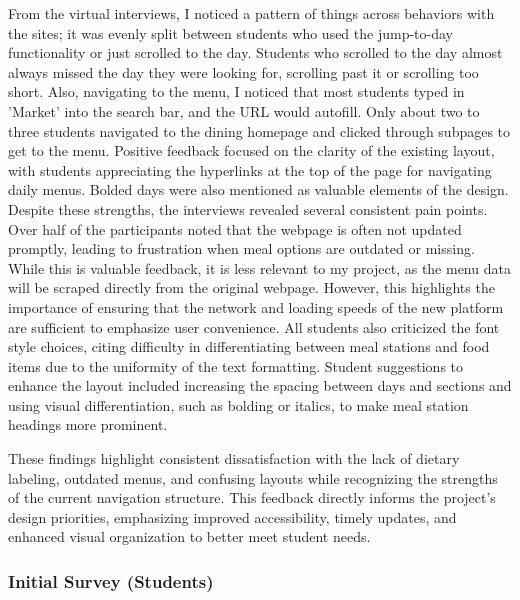 \documentclass[10pt,twocolumn]{article}
\begin{document}
From the virtual interviews, I noticed a pattern of things across behaviors with the sites; it was evenly split between students who used the jump-to-day functionality or just scrolled to the day. Students who scrolled to the day almost always missed the day they were looking for, scrolling past it or scrolling too short. Also, navigating to the menu, I noticed that most students typed in 'Market' into the search bar, and the URL would autofill. Only about two to three students navigated to the dining homepage and clicked through subpages to get to the menu. Positive feedback focused on the clarity of the existing layout, with students appreciating the hyperlinks at the top of the page for navigating daily menus. Bolded days were also mentioned as valuable elements of the design. Despite these strengths, the interviews revealed several consistent pain points. Over half of the participants noted that the webpage is often not updated promptly, leading to frustration when meal options are outdated or missing. While this is valuable feedback, it is less relevant to my project, as the menu data will be scraped directly from the original webpage. However, this highlights the importance of ensuring that the network and loading speeds of the new platform are sufficient to emphasize user convenience. All students also criticized the font style choices, citing difficulty in differentiating between meal stations and food items due to the uniformity of the text formatting. Student suggestions to enhance the layout included increasing the spacing between days and sections and using visual differentiation, such as bolding or italics, to make meal station headings more prominent. 

These findings highlight consistent dissatisfaction with the lack of dietary labeling, outdated menus, and confusing layouts while recognizing the strengths of the current navigation structure. This feedback directly informs the project’s design priorities, emphasizing improved accessibility, timely updates, and enhanced visual organization to better meet student needs.
\subsubsection{Initial Survey (Students)}
\end{document}

